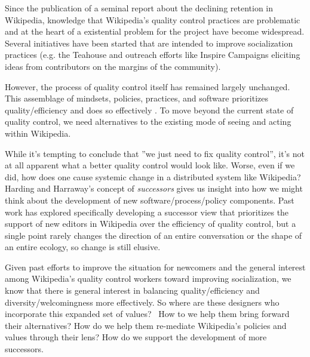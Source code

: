 Since the publication of a seminal report about the declining retention in Wikipedia, knowledge that Wikipedia's quality control practices are problematic and at the heart of a existential problem for the project have become widespread.  Several initiatives have been started that are intended to improve socialization practices (e.g. the Teahouse and outreach efforts like Inspire Campaigns\cite{morgan2015what} eliciting ideas from contributors on the margins of the community).

However, the process of quality control itself has remained largely unchanged.  This assemblage of mindsets, policies, practices, and software prioritizes quality/efficiency and does so effectively \cite{geiger2013levee}\cite{halfaker2014snuggle}.  To move beyond the current state of quality control, we need alternatives to the existing mode of seeing and acting within Wikipedia.

While it's tempting to conclude that ''we just need to fix quality control'', it's not at all apparent what a better quality control would look like.  Worse, even if we did, how does one cause systemic change in a distributed system like Wikipedia?  Harding and Harraway's concept of \emph{successors}\cite{haraway1988situated}\cite{harding1987feminism} gives us insight into how we might think about the development of new software/process/policy components.  Past work has explored specifically developing a successor view that prioritizes the support of new editors in Wikipedia over the efficiency of quality control\cite{halfaker2014snuggle}\cite{geiger2014successor}, but a single point rarely changes the direction of an entire conversation or the shape of an entire ecology, so change is still elusive.

Given past efforts to improve the situation for newcomers\cite{morgan2013tea} and the general interest among Wikipedia's quality control workers toward improving socialization\cite{halfaker2014snuggle}, we know that there is general interest in balancing quality/efficiency and diversity/welcomingness more effectively.  So where are these designers who incorporate this expanded set of values?  How to we help them bring forward their alternatives?  How do we help them re-mediate Wikipedia's policies and values through their lens?  How do we support the development of more successors.

